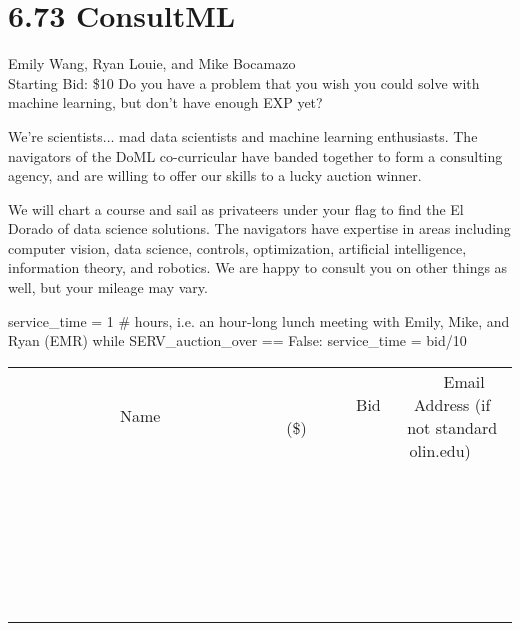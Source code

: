 \documentclass[11pt]{article}
\begin{document}
\section*{6.73 ConsultML}
Emily Wang, Ryan Louie, and Mike Bocamazo
\\
Starting Bid: \$10
\newline
Do you have a problem that you wish you could solve with machine learning, but don't have enough EXP yet?

We're scientists... mad data scientists and machine learning enthusiasts. The navigators of the DoML co-curricular have banded together to form a consulting agency, and are willing to offer our skills to a lucky auction winner. 

We will chart a course and sail as privateers under your flag to find the El Dorado of data science solutions. The navigators have expertise in areas including computer vision, data science, controls, optimization, artificial intelligence, information theory, and robotics. We are happy to consult you on other things as well, but your mileage may vary. 

service\_time = 1 \# hours, i.e. an hour-long lunch meeting with Emily, Mike, and Ryan (EMR)
while SERV\_auction\_over == False:
    service\_time = bid/10
\\[6ex]
\begin{tabular}{c c c}
~~~~~~~~~~~~~Name~~~~~~~~~~~~~ & ~~~~~~~~~Bid (\$)~~~~~~~~~  & ~~~Email Address (if not standard olin.edu)~~~\\
 & & \\
\hline
 & & \\
\hline
 & & \\
\hline
 & & \\
\hline
 & & \\
\hline
 & & \\
\hline
 & & \\
\hline
 & & \\
\hline
 & & \\
\hline
 & & \\
\hline
 & & \\
\hline
 & & \\
\hline
 & & \\
\hline
 & & \\
\hline
 & & \\
\hline
 & & \\
\hline
 & & \\
\hline
 & & \\
\hline
 & & \\
\hline
 & & \\
\hline
 & & \\
\hline
 & & \\
\hline
 & & \\
\hline
 & & \\
\hline
 & & \\
\hline
 & & \\
\hline
\end{tabular}
\newpage
\end{document}
